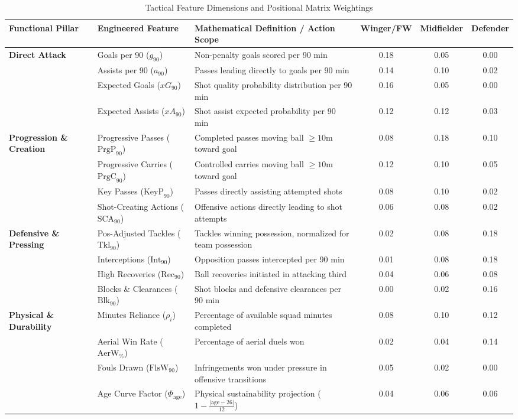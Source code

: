 \documentclass[10pt,journal,compsoc]{IEEEtran}
\begin{document}
\begin{table}[t]
\caption{Tactical Feature Dimensions and Positional Matrix Weightings}
\label{tab:features}
\centering
\begin{tabular}{lllccc}
\toprule
\textbf{Functional Pillar} & \textbf{Engineered Feature} & \textbf{Mathematical Definition / Action Scope} & \textbf{Winger/FW} & \textbf{Midfielder} & \textbf{Defender} \\
\midrule
\multirow{4}{*}{\textbf{Direct Attack}} 
& Goals per 90 ($g_{90}$) & Non-penalty goals scored per 90 min & 0.18 & 0.05 & 0.00 \\
& Assists per 90 ($a_{90}$) & Passes leading directly to goals per 90 min & 0.14 & 0.10 & 0.02 \\
& Expected Goals ($xG_{90}$) & Shot quality probability distribution per 90 min & 0.16 & 0.05 & 0.00 \\
& Expected Assists ($xA_{90}$) & Shot assist expected probability per 90 min & 0.12 & 0.12 & 0.03 \\
\midrule
\multirow{4}{*}{\textbf{Progression \& Creation}} 
& Progressive Passes ($\text{PrgP}_{90}$) & Completed passes moving ball $\ge 10\text{m}$ toward goal & 0.08 & 0.18 & 0.10 \\
& Progressive Carries ($\text{PrgC}_{90}$) & Controlled carries moving ball $\ge 10\text{m}$ toward goal & 0.12 & 0.10 & 0.05 \\
& Key Passes ($\text{KeyP}_{90}$) & Passes directly assisting attempted shots & 0.08 & 0.10 & 0.02 \\
& Shot-Creating Actions ($\text{SCA}_{90}$) & Offensive actions directly leading to shot attempts & 0.06 & 0.08 & 0.02 \\
\midrule
\multirow{4}{*}{\textbf{Defensive \& Pressing}} 
& Pos-Adjusted Tackles ($\text{Tkl}_{90}$) & Tackles winning possession, normalized for team possession & 0.02 & 0.08 & 0.18 \\
& Interceptions ($\text{Int}_{90}$) & Opposition passes intercepted per 90 min & 0.01 & 0.08 & 0.18 \\
& High Recoveries ($\text{Rec}_{90}$) & Ball recoveries initiated in attacking third & 0.04 & 0.06 & 0.08 \\
& Blocks \& Clearances ($\text{Blk}_{90}$) & Shot blocks and defensive clearances per 90 min & 0.00 & 0.02 & 0.16 \\
\midrule
\multirow{4}{*}{\textbf{Physical \& Durability}} 
& Minutes Reliance ($\rho_i$) & Percentage of available squad minutes completed & 0.08 & 0.10 & 0.12 \\
& Aerial Win Rate ($\text{AerW}_{\%}$) & Percentage of aerial duels won & 0.02 & 0.04 & 0.14 \\
& Fouls Drawn ($\text{FlsW}_{90}$) & Infringements won under pressure in offensive transitions & 0.05 & 0.02 & 0.00 \\
& Age Curve Factor ($\Phi_{\text{age}}$) & Physical sustainability projection ($1 - \frac{|\text{age}-26|}{12}$) & 0.04 & 0.06 & 0.06 \\
\bottomrule
\end{tabular}
\end{table}
\end{document}
